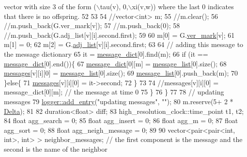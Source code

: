 \begin{DoxyCode}
{       vector with size 3 of the form (\(\backslash\)tau(v), 0,\(\backslash\)xi(v,w)) where the last 0 indicates that there is no offspring.}
52 
53 
54       \textcolor{comment}{//vector<int> m;}
55       \textcolor{comment}{//m.clear();}
56       \textcolor{comment}{//m.push\_back(G.ver\_mark[v]);}
57       \textcolor{comment}{//m.push\_back(0);}
58       \textcolor{comment}{//m.push\_back(G.adj\_list[v][i].second.first);}
59 
60       m[0] = G.\hyperlink{classmarked__graph_ac83e9377dd4d8bb95be1ac949b127296}{ver\_mark}[v];
61       m[1] = 0;
62       m[2] = G.\hyperlink{classmarked__graph_a1a0bf7ca413a278763f7c878b3b6fd6f}{adj\_list}[v][i].second.first;
63 
64       \textcolor{comment}{// adding this message to the message dictionary}
65       it = \hyperlink{classgraph__message_ab54d89b122c2b1322da0d5db2043fb84}{message\_dict}[0].find(m); 
66       \textcolor{keywordflow}{if} (it == \hyperlink{classgraph__message_ab54d89b122c2b1322da0d5db2043fb84}{message\_dict}[0].end())\{
67         \hyperlink{classgraph__message_ab54d89b122c2b1322da0d5db2043fb84}{message\_dict}[0][m] = \hyperlink{classgraph__message_aa17fdb629b423343edfafa97252763ef}{message\_list}[0].size();
68         \hyperlink{classgraph__message_aac77e098f0acf9650116a8e51fe3b4b7}{messages}[v][i][0] = \hyperlink{classgraph__message_aa17fdb629b423343edfafa97252763ef}{message\_list}[0].size();
69         \hyperlink{classgraph__message_aa17fdb629b423343edfafa97252763ef}{message\_list}[0].push\_back(m);
70       \}\textcolor{keywordflow}{else}\{
71         \hyperlink{classgraph__message_aac77e098f0acf9650116a8e51fe3b4b7}{messages}[v][i][0] = it->second;
72       \}
73 
74       \textcolor{comment}{//messages[v][i][0] = message\_dict[0][m]; // the message at time 0}
75     \}
76   \}
77 
78   \textcolor{comment}{// updating messages}
79   \hyperlink{classlogger_a710163deb17bc81f70d53d285b8ac9ac}{logger::add\_entry}(\textcolor{stringliteral}{"updating messages"}, \textcolor{stringliteral}{""});
80   m.reserve(5+ 2 * \hyperlink{classgraph__message_a45dfd061b7bc73572e5132fbf66efd55}{Delta});
81 
82   duration<float> diff;
83   high\_resolution\_clock::time\_point t1, t2; 
84   \textcolor{keywordtype}{float} agg\_search = 0;
85   \textcolor{keywordtype}{float} agg\_insert = 0;
86   \textcolor{keywordtype}{float} agg\_m = 0;
87   \textcolor{keywordtype}{float} agg\_sort = 0;
88   \textcolor{keywordtype}{float} agg\_neigh\_message = 0;
89 
90   vector<pair<pair<int, int>, \textcolor{keywordtype}{int}> > neighbor\_messages; \textcolor{comment}{// the first component is the message and the
       second is the name of the neighbor}

\end{DoxyCode}
